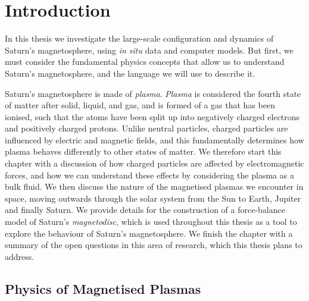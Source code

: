 \chapter{Introduction}
\label{chap:intro}

In this thesis we investigate the large-scale configuration and dynamics of Saturn's magnetosphere, using \textit{in situ} data and computer models. But first, we must consider the fundamental physics concepts that allow us to understand Saturn's magnetosphere, and the language we will use to describe it. 

Saturn's magnetosphere is made of \textit{plasma}. \textit{Plasma} is considered the fourth state of matter after solid, liquid, and gas, and is formed of a gas that has been ionised, such that the atoms have been split up into negatively charged electrons and positively charged protons. Unlike neutral particles, charged particles are influenced by electric and magnetic fields, and this fundamentally determines how plasma behaves differently to other states of matter. We therefore start this chapter with a discussion of how charged particles are affected by electromagnetic forces, and how we can understand these effects by considering the plasma as a bulk fluid. We then discuss the nature of the magnetised plasmas we encounter in space, moving outwards through the solar system from the Sun to Earth, Jupiter and finally Saturn. We provide details for the construction of a force-balance model of Saturn's \textit{magnetodisc}, which is used throughout this thesis as a tool to explore the behaviour of Saturn's magnetosphere. We finish the chapter with a summary of the open questions in this area of research, which this thesis plans to address.

\section{Physics of Magnetised Plasmas}
